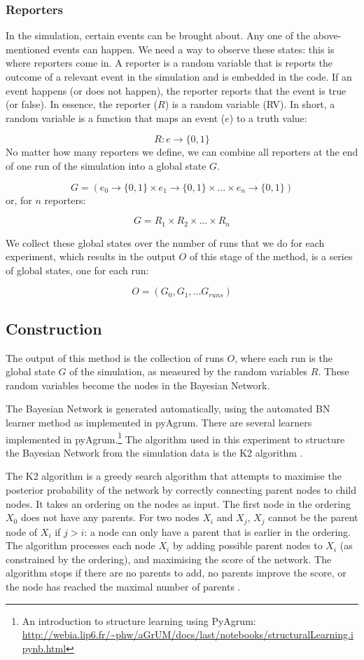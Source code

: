 \documentclass[12pt]{article}
\begin{document}
\subsubsection{Reporters}

In the simulation, certain events can be brought about. Any one of the above-mentioned events can happen. We need a way to observe these states: this is where reporters come in. A reporter is a random variable that is reports the outcome of a relevant event in the simulation and is embedded in the code. If an event happens (or does not happen), the reporter reports that the event is true (or false). In essence, the reporter ($R$) is a random variable (RV). In short, a random variable is a function that maps an event ($e$) to a truth value:

\[ R : e \rightarrow \{0, 1\} \]
No matter how many reporters we define, we can combine all reporters at the end of one run of the simulation into a global state $G$.

\[ G = (e_0 \rightarrow \{0, 1\} \times e_1 \rightarrow \{0, 1\} \times ... \times e_n \rightarrow \{0, 1\})\]
 or, for $n$ reporters:
 
\[ G = R_1 \times R_2 \times... \times R_n\]

We collect these global states over the number of runs that we do for each experiment, which results in the output $O$ of this stage of the method, is a series of global states, one for each run:

\[ O = (G_0, G_1, ... G_{runs})\]


\subsection{Construction}
The output of this method is the collection of runs $O$, where each run is the global state $G$ of the simulation, as measured by the random variables $R$. These random variables become the nodes in the Bayesian Network.

The Bayesian Network is generated automatically, using the automated BN learner method as implemented in pyAgrum. There are several learners implemented in pyAgrum.\footnote{An introduction to structure learning using PyAgrum: \url{http://webia.lip6.fr/~phw/aGrUM/docs/last/notebooks/structuralLearning.ipynb.html}} The algorithm used in this experiment to structure the Bayesian Network from the simulation data is the K2 algorithm \citep{Cooper1992}. 

The K2 algorithm is a greedy search algorithm that attempts to maximise the posterior probability of the network by correctly connecting parent nodes to child nodes. It takes an ordering on the nodes as input. The first node in the ordering $X_0$ does not have any parents. For two nodes $X_i$ and $X_j$, $X_j$ cannot be the parent node of $X_i$ if $j > i$: a node can only have a parent that is earlier in the ordering. The algorithm processes each node $X_i$ by adding possible parent nodes to $X_i$ (as constrained by the ordering), and maximising the score of the network. The algorithm stops if there are no parents to add, no parents improve the score, or the node has reached the maximal number of parents \citep{Chen2008}.
\end{document}
